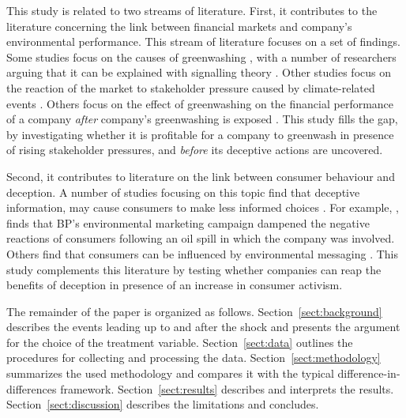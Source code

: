 \documentclass[12pt]{article}
\begin{document}
This study is related to two streams of literature. First, it contributes to the literature concerning the link between financial markets and company's environmental performance. This stream of literature focuses on a set of findings. Some studies focus on the causes of greenwashing \parencite{servaesImpactCorporateSocial2013,berroneDoesGreenwashingPay2017,kimGreenwashVsBrownwash2015,testaDoesItPay2018}, with a number of researchers arguing that it can be explained with signalling theory \parencite{lyonGreenwashCorporateEnvironmental2011,wuBadGreenwashingGood2020}. Other studies focus on the reaction of the market to stakeholder pressure caused by climate-related events \parencite{birindelliJustBlahBlah2023,schusterStockPriceReactions2023, diaz-raineyTrumpVsParis2021, bouzzineStockPriceReactions2021,cartellierCanInvestorsCurb2023, }. Others focus on the effect of greenwashing on the financial performance of a company \textit{after} company's greenwashing is exposed \parencite{tetiDoesGreenwashingAffect2024, karpoffReputationalPenaltiesEnvironmental2005, konarDoesMarketValue2001,torelliGreenwashingEnvironmentalCommunication2020}. This study fills the gap, by investigating whether it is profitable for a company to greenwash in presence of rising stakeholder pressures, and \textit{before} its deceptive actions are uncovered.


Second, it contributes to literature on the link between consumer behaviour and deception. A number of studies focusing on this topic find that deceptive information, may cause consumers to make less informed choices \parencite{raoDemandHealthyProducts2017,bronnenbergPharmacistsBuyBayer2015}. For example, \textcite{barrageAdvertisingEnvironmentalStewardship2020}, finds that BP's environmental marketing campaign dampened the negative reactions of consumers following an oil spill in which the company was involved. Others find that consumers can be influenced by environmental messaging \parencite{parguelCanEvokingNature2015,schmuckMisleadingConsumersGreen2018,nyilasyPerceivedGreenwashingInteractive2014}. This study complements this literature by testing whether companies can reap the benefits of deception in presence of an increase in consumer activism.

The remainder of the paper is organized as follows. Section~\ref{sect:background} describes the events leading up to and after the shock and presents the argument for the choice of the treatment variable. Section~\ref{sect:data} outlines the procedures for collecting and processing the data. Section~\ref{sect:methodology} summarizes the used methodology and compares it with the typical difference-in-differences framework. Section~\ref{sect:results} describes and interprets the results. Section~\ref{sect:discussion} describes the limitations and concludes.
\end{document}
